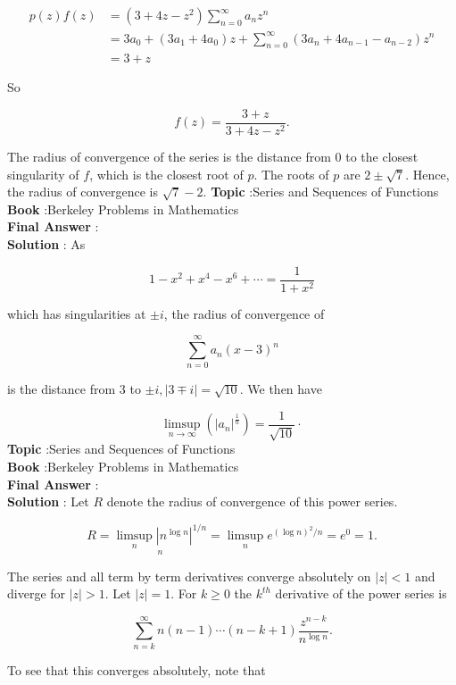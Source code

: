 \documentclass[10pt]{article}
\begin{document}
$$
\begin{aligned}
p(z) f(z) &=\left(3+4 z-z^{2}\right) \sum_{n=0}^{\infty} a_{n} z^{n} \\
&=3 a_{0}+\left(3 a_{1}+4 a_{0}\right) z+\sum_{n=0}^{\infty}\left(3 a_{n}+4 a_{n-1}-a_{n-2}\right) z^{n} \\
&=3+z
\end{aligned}
$$

So

$$
f(z)=\frac{3+z}{3+4 z-z^{2}} .
$$

The radius of convergence of the series is the distance from 0 to the closest singularity of $f$, which is the closest root of $p$. The roots of $p$ are $2 \pm \sqrt{7}$. Hence, the radius of convergence is $\sqrt{7}-2$.
\textbf{Topic} :Series and Sequences of Functions \\
\textbf{Book} :Berkeley Problems in Mathematics\\
\textbf{Final Answer} :\\


\textbf{Solution} : As

$$
1-x^{2}+x^{4}-x^{6}+\cdots=\frac{1}{1+x^{2}}
$$

which has singularities at $\pm i$, the radius of convergence of

$$
\sum_{n=0}^{\infty} a_{n}(x-3)^{n}
$$

is the distance from 3 to $\pm i,|3 \mp i|=\sqrt{10}$. We then have

$$
\limsup _{n \rightarrow \infty}\left(\left|a_{n}\right|^{\frac{1}{n}}\right)=\frac{1}{\sqrt{10}} \cdot
$$
\textbf{Topic} :Series and Sequences of Functions \\
\textbf{Book} :Berkeley Problems in Mathematics\\
\textbf{Final Answer} :\\


\textbf{Solution} : Let $R$ denote the radius of convergence of this power series.

$$
R=\underset{n}{\limsup _{n}\left|n^{\log n}\right|^{1 / n}}=\limsup _{n} e^{(\log n)^{2} / n}=e^{0}=1 .
$$

The series and all term by term derivatives converge absolutely on $|z|<1$ and diverge for $|z|>1$. Let $|z|=1$. For $k \geqslant 0$ the $k^{t h}$ derivative of the power series is

$$
\sum_{n=k}^{\infty} n(n-1) \cdots(n-k+1) \frac{z^{n-k}}{n^{\log n}} .
$$

To see that this converges absolutely, note that
\end{document}

